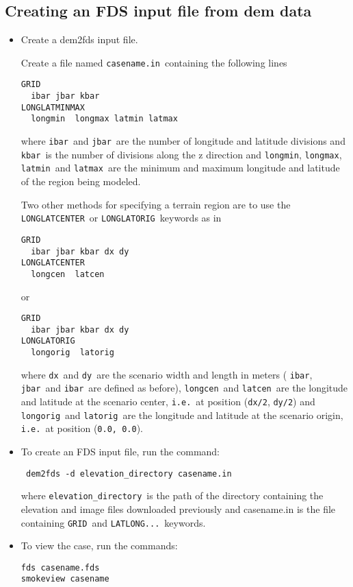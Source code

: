 \subsection{Creating an FDS input file from dem data}
\begin{itemize}
\item Create a dem2fds input file.

Create a file named {\tt casename.in}\ containing the following lines

\begin{verbatim}
GRID
  ibar jbar kbar
LONGLATMINMAX
  longmin  longmax latmin latmax
\end{verbatim}

where {\tt ibar}\ and {\tt jbar}\ are the number of longitude and latitude divisions
and {\tt kbar}\ is the number of divisions along the z direction and
{\tt longmin}, {\tt longmax}, {\tt latmin}\ and {\tt latmax}\
are the minimum and maximum
longitude and latitude of the region  being modeled.

Two other methods for specifying a terrain region are to use the
{\tt LONGLATCENTER}\ or {\tt LONGLATORIG}\ keywords as in

\begin{verbatim}
GRID
  ibar jbar kbar dx dy
LONGLATCENTER
  longcen  latcen
\end{verbatim}

or

\begin{verbatim}
GRID
  ibar jbar kbar dx dy
LONGLATORIG
  longorig  latorig
\end{verbatim}

where {\tt dx}\ and {\tt dy}\ are the scenario width and length in meters
( {\tt ibar}, {\tt jbar}\ and {\tt ibar}\ are defined as before),
{\tt longcen}\ and {\tt latcen}\ are the longitude and
latitude at the scenario center,
{\tt i.e.}\ at position ({\tt dx/2}, {\tt dy/2})
and {\tt longorig}\ and {\tt latorig}\ are the longitude and
latitude at the scenario origin,
{\tt i.e.}\ at position ({\tt 0.0, 0.0}).

\item To create an FDS input file, run the command:
\begin{verbatim}
 dem2fds -d elevation_directory casename.in
\end{verbatim}
where {\tt elevation\_directory}\ is the path of the directory containing the
elevation and image files downloaded previously and
casename.in is the file containing {\tt GRID}\ and {\tt LATLONG...}\ keywords.

\item To view the case, run the commands:
\begin{verbatim}
fds casename.fds
smokeview casename
\end{verbatim}
\end{itemize}

